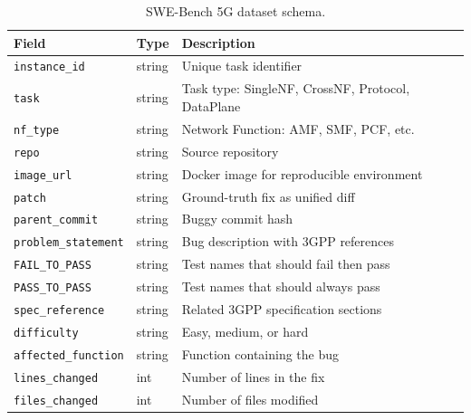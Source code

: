 \documentclass[10pt,conference]{IEEEtran}
\begin{document}
\begin{table}[h]
\centering
\caption{SWE-Bench 5G dataset schema.}
\label{tab:schema}
\setlength{\tabcolsep}{3pt}
\renewcommand{\arraystretch}{1.1}
\begin{tabular}{@{} l l p{4.2cm} @{}}
\toprule
Field & Type & Description \\
\midrule
\texttt{instance\_id} & string & Unique task identifier \\
\texttt{task} & string & Task type: SingleNF, CrossNF, Protocol, DataPlane \\
\texttt{nf\_type} & string & Network Function: AMF, SMF, PCF, etc. \\
\texttt{repo} & string & Source repository \\
\texttt{image\_url} & string & Docker image for reproducible environment \\
\texttt{patch} & string & Ground-truth fix as unified diff \\
\texttt{parent\_commit} & string & Buggy commit hash \\
\texttt{problem\_statement} & string & Bug description with 3GPP references \\
\texttt{FAIL\_TO\_PASS} & string & Test names that should fail then pass \\
\texttt{PASS\_TO\_PASS} & string & Test names that should always pass \\
\texttt{spec\_reference} & string & Related 3GPP specification sections \\
\texttt{difficulty} & string & Easy, medium, or hard \\
\texttt{affected\_function} & string & Function containing the bug \\
\texttt{lines\_changed} & int & Number of lines in the fix \\
\texttt{files\_changed} & int & Number of files modified \\
\bottomrule
\end{tabular}
\end{table}
\end{document}
